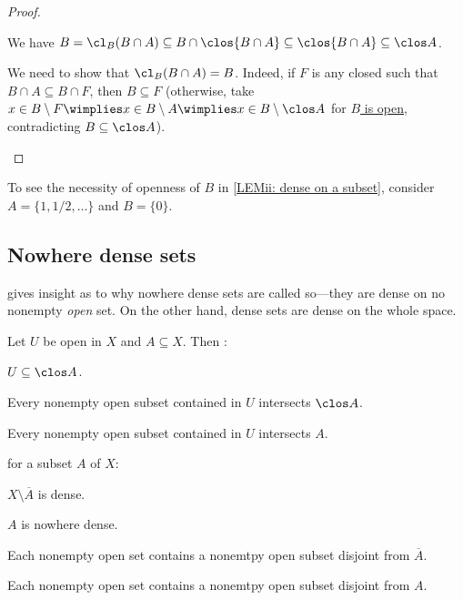 	\begin{proof}
		\begin{mylist}
			\item We have $B = \cl_B(B\cap A)\subseteq B\cap \clos{B\cap A}\subseteq\clos{B\cap A}\subseteq\clos A$.
			
			\item We need to show that $\cl_B(B\cap A) = B$. Indeed, if $F$ is any closed such that $B\cap A\subseteq B\cap F$, then $B\subseteq F$ (otherwise, take $x\in B\setminus F\wimplies x\in B\setminus A\wimplies x\in B\setminus \clos A$ for \uline{$B$ is open}, contradicting $B\subseteq \clos A$).\qedhere
		\end{mylist}
	\end{proof}
	
	\begin{rmk}
		To see the necessity of openness of $B$ in \ref{LEMii: dense on a subset}, consider $A = \{1, 1/2, \ldots\}$ and $B = \{0\}$.
	\end{rmk}
	
	
	
\subsection{Nowhere dense sets}
	
	 gives insight as to why nowhere dense sets are called so---they are dense on no nonempty \emph{open} set. On the other hand, dense sets are dense on the whole space.
	
	\begin{lem}
		Let $U$ be open in $X$ and $A\subseteq X$. Then \tfae:
		\begin{mylist}
			\item $U\subseteq \clos A$.
			
			\item Every nonempty open subset contained in $U$ intersects $\clos A$.
			
			\item Every nonempty open subset contained in $U$ intersects $A$.
		\end{mylist}
	\end{lem}
	
	\begin{cor}\label{COR: characterizing nowhere dense}
		\Tfae for a subset $A$ of $X$:
		\begin{mylist}
			\item $X\setminus \overline A$ is dense.
			
			\item $A$ is nowhere dense.
			
			\item Each nonempty open set contains a nonemtpy open subset disjoint from $\overline A$.
			
			\item Each nonempty open set contains a nonemtpy open subset disjoint from $A$.
		\end{mylist}
	\end{cor}
	
